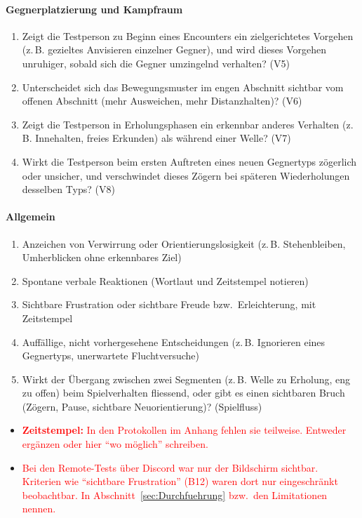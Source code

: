 \documentclass[../Main.tex]{subfiles}
\begin{document}
\paragraph{Gegnerplatzierung und Kampfraum}
\begin{enumerate}[label=\textbf{B\arabic*}, leftmargin=1.5cm, itemsep=0.5em, resume]
    \item Zeigt die Testperson zu Beginn eines Encounters ein zielgerichtetes Vorgehen (z.\,B. gezieltes Anvisieren einzelner Gegner), und wird dieses Vorgehen unruhiger, sobald sich die Gegner umzingelnd verhalten? \hfill (V5)
    \item Unterscheidet sich das Bewegungsmuster im engen Abschnitt sichtbar vom offenen Abschnitt (mehr Ausweichen, mehr Distanzhalten)? \hfill (V6)
    \item Zeigt die Testperson in Erholungsphasen ein erkennbar anderes Verhalten (z.\,B. Innehalten, freies Erkunden) als während einer Welle? \hfill (V7)
    \item Wirkt die Testperson beim ersten Auftreten eines neuen Gegnertyps zögerlich oder unsicher, und verschwindet dieses Zögern bei späteren Wiederholungen desselben Typs? \hfill (V8)
\end{enumerate}

\paragraph{Allgemein}
\begin{enumerate}[label=\textbf{B\arabic*}, leftmargin=1.5cm, itemsep=0.5em, resume]
    \item Anzeichen von Verwirrung oder Orientierungslosigkeit (z.\,B. Stehenbleiben, Umherblicken ohne erkennbares Ziel)
    \item Spontane verbale Reaktionen (Wortlaut und Zeitstempel notieren)
    \item Sichtbare Frustration oder sichtbare Freude bzw.\ Erleichterung, mit Zeitstempel
    \item Auffällige, nicht vorhergesehene Entscheidungen (z.\,B. Ignorieren eines Gegnertyps, unerwartete Fluchtversuche)
    \item Wirkt der Übergang zwischen zwei Segmenten (z.\,B. Welle zu Erholung, eng zu offen) beim Spielverhalten fliessend, oder gibt es einen sichtbaren Bruch (Zögern, Pause, sichtbare Neuorientierung)? \hfill (Spielfluss)
\end{enumerate}

\begin{itemize}[leftmargin=1.5cm]
    \item \textcolor{red}{\textbf{Zeitstempel:} In den Protokollen im Anhang fehlen sie teilweise. Entweder ergänzen oder hier \enquote{wo möglich} schreiben.}
    \item \textcolor{red}{Bei den Remote-Tests über Discord war nur der Bildschirm sichtbar. Kriterien wie \enquote{sichtbare Frustration} (B12) waren dort nur eingeschränkt beobachtbar. In Abschnitt~\ref{sec:Durchfuehrung} bzw.\ den Limitationen nennen.}
\end{itemize}
\end{document}
